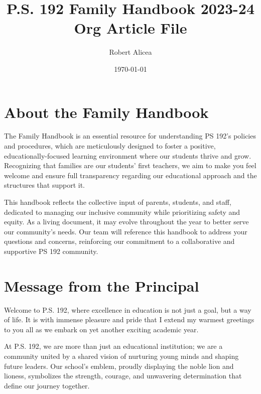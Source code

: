 \documentclass[letterpaper, 11pt]{article}
\author{Robert Alicea}
\date{\today}
\title{P.S. 192 Family Handbook 2023-24 Org Article File}
\begin{document}


\pagenumbering{\fancyhf{}}
\pagestyle{headings}

\fancyhead[R]{\thepage}

\pagestyle{fancy}
\renewcommand{\footrulewidth}{1px}


\clearpage
\clearpage \tableofcontents \clearpage


\section{About the Family Handbook}
\label{sec:org2ff9cd1}
The Family Handbook is an essential resource for understanding PS 192's policies and procedures, which are meticulously designed to foster a positive, educationally-focused learning environment where our students thrive and grow. Recognizing that families are our students' first teachers, we aim to make you feel welcome and ensure full transparency regarding our educational approach and the structures that support it.

This handbook reflects the collective input of parents, students, and staff, dedicated to managing our inclusive community while prioritizing safety and equity. As a living document, it may evolve throughout the year to better serve our community's needs. Our team will reference this handbook to address your questions and concerns, reinforcing our commitment to a collaborative and supportive PS 192 community.

\clearpage

\section{Message from the Principal}
\label{sec:org33e3e35}

Welcome to P.S. 192, where excellence in education is not just a goal, but a way of life. It is with immense pleasure and pride that I extend my warmest greetings to you all as we embark on yet another exciting academic year.

At P.S. 192, we are more than just an educational institution; we are a community united by a shared vision of nurturing young minds and shaping future leaders. Our school’s emblem, proudly displaying the noble lion and lioness, symbolizes the strength, courage, and unwavering determination that define our journey together.
\end{document}
